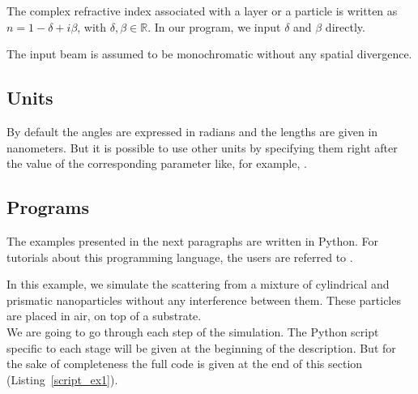 
\noindent The complex refractive index associated with a layer or a particle is written as $n=1-\delta +i\beta$, with
$\delta, \beta \in \mathbb{R}$. In our program, we input $\delta$ and
$\beta$ directly.


\noindent The input beam is assumed to be monochromatic without any
spatial divergence.\\ %

\subsection{Units}
By default the angles are expressed in radians and the lengths are given in
nanometers.  But it is possible to use other units by
specifying them right after the value of the corresponding
parameter like, for example, .


\subsection{Programs}

The examples presented in the next paragraphs are written in Python. For tutorials about this
   programming language, the users are referred to \cite{Lut09}.


 

In this example, we simulate the scattering from a mixture of
cylindrical and prismatic nanoparticles without any interference
between them. These particles are placed in air, on top
of a substrate.\\ We are going to go through each step of the
simulation. The Python script specific to each stage will be given at
the beginning of the description. But for the sake of completeness the full code is given
at the end of this section (Listing~\ref{script_ex1}). \\

